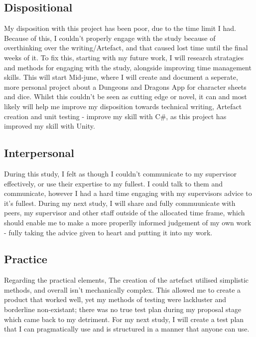 \documentclass[conference]{IEEEtran}
\begin{document}
\subsection{Dispositional}
My disposition with this project has been poor, due to the time limit I had. Because of this, I couldn't properly engage with the study because of overthinking over the writing/Artefact, and that caused lost time until the final weeks of it. To fix this, starting with my future work, I will research stratagies and methods for engaging with the study, alongside improving time management skills.  This will start Mid-june, where I will create and document a seperate, more personal project about a Dungeons and Dragons App for character sheets and dice. Whilst this couldn't be seen as cutting edge or novel, it can and most likely will help me improve my disposition towards technical writing, Artefact creation and unit testing - improve my skill with C\#, as this project has improved my skill with Unity.

\subsection{Interpersonal}
During this study, I felt as though I couldn't communicate to my supervisor effectively, or use their expertise to my fullest. I could talk to them and communicate, however I had a hard time engaging with my supervisors advice to it's fullest. During my next study, I will share and fully commuunicate with peers, my supervisor and other staff outside of the allocated time frame, which should enable me to make  a more  properlly informed judgement of my own work - fully taking the advice given to heart and putting it into my work.

\subsection{Practice}
Regarding the practical elements,  The creation of the artefact utilised simplistic methods, and overall isn't mechanically complex. This allowed me to create a product that worked well, yet my methods of testing were lackluster and borderline non-existant; there was no true test plan during my proposal stage which came back to my detriment. For my next study, I will create a test plan that I can pragmatically use and is structured in a manner that anyone can use. 
\end{document}
